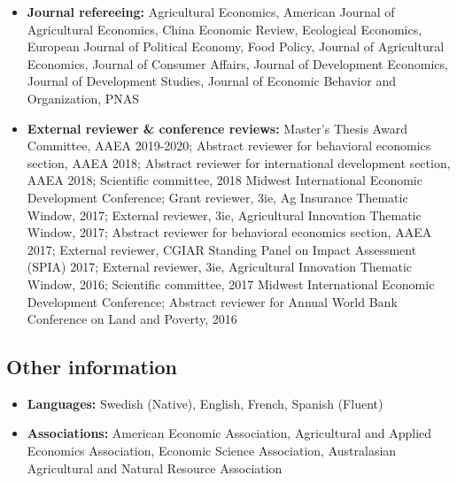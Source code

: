\documentclass[11pt]{article}
\begin{document}
\begin{itemize}[itemsep=.9pt, leftmargin=20pt]
    \item[]\textbf{Journal refereeing:} Agricultural Economics, American Journal of Agricultural Economics, China Economic Review, Ecological Economics, European Journal of Political Economy, Food Policy, Journal of Agricultural Economics, Journal of Consumer Affairs, Journal of Development Economics, Journal of Development Studies, Journal of Economic Behavior and Organization, PNAS
    \item[]\textbf{External reviewer \& conference reviews:} Master\textquoteright s Thesis Award Committee, AAEA 2019-2020; Abstract reviewer for behavioral economics section, AAEA 2018; Abstract reviewer for international development section, AAEA 2018; Scientific committee, 2018 Midwest International Economic Development Conference; Grant reviewer, 3ie, Ag Insurance Thematic Window, 2017; External reviewer, 3ie, Agricultural Innovation Thematic Window, 2017; Abstract reviewer for behavioral economics section, AAEA 2017; External reviewer, CGIAR Standing Panel on Impact Assessment (SPIA) 2017; External reviewer, 3ie, Agricultural Innovation Thematic Window, 2016; Scientific committee, 2017 Midwest International Economic Development Conference; Abstract reviewer for Annual World Bank Conference on Land and Poverty, 2016
\end{itemize}

\subsection*{\sc Other information}
\begin{itemize}[itemsep=.9pt, leftmargin=20pt]
    \item[]\textbf{Languages:} Swedish (Native), English, French, Spanish (Fluent)
    \item[]\textbf{Associations:} American Economic Association, Agricultural and Applied Economics Association, Economic Science Association, Australasian Agricultural and Natural Resource Association
\end{itemize}
\end{document}
